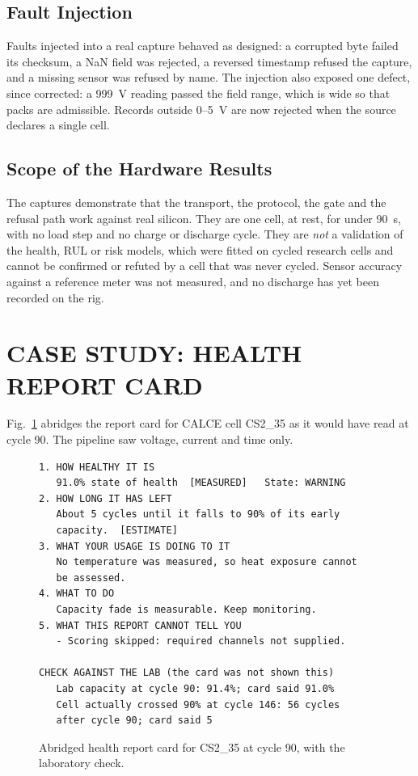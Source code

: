 \subsection{Fault Injection}

Faults injected into a real capture behaved as designed: a corrupted byte failed its checksum, a NaN field was rejected, a reversed timestamp refused the capture, and a missing sensor was refused by name. The injection also exposed one defect, since corrected: a 999~V reading passed the field range, which is wide so that packs are admissible. Records outside 0--5~V are now rejected when the source declares a single cell.

\subsection{Scope of the Hardware Results}

The captures demonstrate that the transport, the protocol, the gate and the refusal path work against real silicon. They are one cell, at rest, for under 90~s, with no load step and no charge or discharge cycle. They are \emph{not} a validation of the health, RUL or risk models, which were fitted on cycled research cells and cannot be confirmed or refuted by a cell that was never cycled. Sensor accuracy against a reference meter was not measured, and no discharge has yet been recorded on the rig.

\section{CASE STUDY: HEALTH REPORT CARD}
\label{sec:res-card}

Fig.~\ref{fig:card} abridges the report card for CALCE cell CS2\_35 as it would have read at cycle 90. The pipeline saw voltage, current and time only.

\begin{figure}[htbp]
    \centering
    {\footnotesize
\begin{verbatim}
1. HOW HEALTHY IT IS
   91.0% state of health  [MEASURED]   State: WARNING
2. HOW LONG IT HAS LEFT
   About 5 cycles until it falls to 90% of its early
   capacity.  [ESTIMATE]
3. WHAT YOUR USAGE IS DOING TO IT
   No temperature was measured, so heat exposure cannot
   be assessed.
4. WHAT TO DO
   Capacity fade is measurable. Keep monitoring.
5. WHAT THIS REPORT CANNOT TELL YOU
   - Scoring skipped: required channels not supplied.

CHECK AGAINST THE LAB (the card was not shown this)
   Lab capacity at cycle 90: 91.4%; card said 91.0%
   Cell actually crossed 90% at cycle 146: 56 cycles
   after cycle 90; card said 5
\end{verbatim}}
    \caption{Abridged health report card for CS2\_35 at cycle 90, with the laboratory check.}
    \label{fig:card}
\end{figure}

